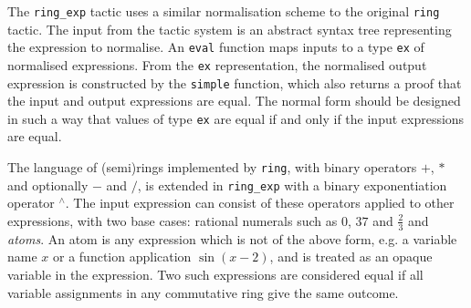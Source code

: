 \documentclass{llncs}
\newcommand{\lean}[1]{\texttt{#1}\xspace} %
\newcommand{\pow}{{${}^\wedge$}\xspace}
\newcommand{\ring}{\lean{ring}}
\newcommand{\ringexp}{\lean{ring\_exp}}
\begin{document}
The \ringexp tactic uses a similar normalisation scheme to the original \ring tactic.
The input from the tactic system is an abstract syntax tree representing the expression to normalise.
An \lean{eval} function maps inputs to a type \lean{ex} of normalised expressions.
From the \lean{ex} representation, the normalised output expression is constructed by the \lean{simple} function,
which also returns a proof that the input and output expressions are equal.
The normal form should be designed in such a way that values of type \lean{ex} are equal if and only if the input expressions are equal.

The language of (semi)rings implemented by \ring, with binary operators $+$, $*$ and optionally $-$ and $/$,
is extended in \ringexp with a binary exponentiation operator \pow.
The input expression can consist of these operators applied to other expressions,
with two base cases: rational numerals such as $0$, $37$ and $\frac{2}{3}$ and \emph{atoms}.
An atom is any expression which is not of the above form, e.g. a variable name $x$ or a function application $\sin (x - 2)$,
and is treated as an opaque variable in the expression.
Two such expressions are considered equal if all variable assignments in any commutative ring give the same outcome.

\end{document}
